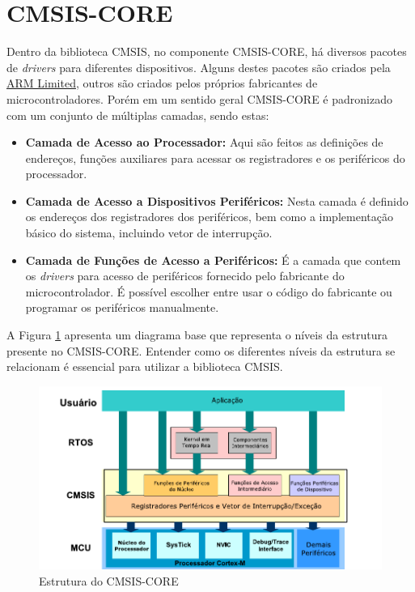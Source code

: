\section{CMSIS-CORE}

Dentro da biblioteca CMSIS, no componente CMSIS-CORE, há diversos pacotes de \emph{drivers} para diferentes dispositivos. Alguns destes pacotes são criados pela \href{http://infocenter.arm.com/help/index.jsp}{ARM Limited}, outros são criados pelos próprios fabricantes de microcontroladores.  Porém em um sentido geral CMSIS-CORE é padronizado com um conjunto de múltiplas camadas, sendo estas:

\begin{itemize}
	\item \textbf{Camada de Acesso ao Processador:} Aqui são feitos as definições de endereços, funções auxiliares para acessar os registradores e os periféricos do processador.
	
	\item \textbf{Camada de Acesso a Dispositivos Periféricos:} Nesta camada é definido os endereços dos registradores dos periféricos, bem como a implementação básico do sistema, incluindo vetor de interrupção.
	
	\item   \textbf{Camada de Funções de Acesso a Periféricos:} É a camada que contem os \emph{drivers} para acesso de periféricos fornecido pelo fabricante do microcontrolador. É possível escolher entre usar o código do fabricante ou programar os periféricos manualmente. 
\end{itemize}

A Figura \ref{fig:CMSIS-CORE} apresenta um diagrama base que representa o níveis da estrutura presente no CMSIS-CORE. Entender como os diferentes níveis da estrutura se relacionam é essencial para  utilizar a biblioteca CMSIS.

\begin{figure}[!h]
	\centering
	\includegraphics[width=1\textwidth] {figuras/CMSIS-CoreStructure.pdf}
	\caption{Estrutura do CMSIS-CORE}
	\label{fig:CMSIS-CORE}
\end{figure}



